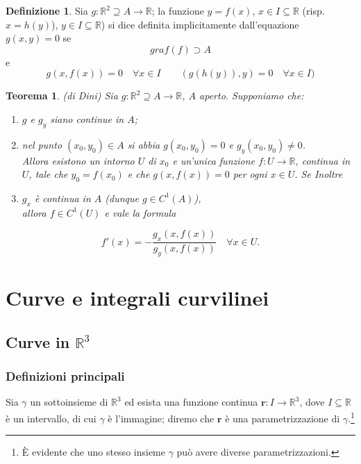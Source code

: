 \documentclass[a4paper]{book}
\numberwithin{equation}{section}
\theoremstyle{plain}
\newtheorem{teor}{Teorema}[section]
\theoremstyle{definition}
\newtheorem{defn}{Definizione}[section]
\theoremstyle{remark}
\renewcommand{\vec}{\boldsymbol}
\theoremstyle{example}
\begin{document}
\begin{defn}
	Sia $g:\mathbb{R}^2 \supseteq A \rightarrow \mathbb{R}$; la funzione $y=f(x)$, $x \in I \subseteq \mathbb{R}$ (risp. $x = h(y)$), $y \in I \subseteq \mathbb{R}$) si dice definita implicitamente dall'equazione $g(x,y) = 0$ se
	\begin{equation}
		graf(f) \supset A
	\end{equation}
	e
	\begin{equation*}
		g(x,f(x)) = 0 \quad \forall x \in I \quad \quad (g(h(y)),y) = 0 \quad \forall x \in I)
	\end{equation*}
\end{defn}

\begin{teor} (di Dini) Sia $g:\mathbb{R}^2 \supseteq A \rightarrow \mathbb{R}$, $A$ aperto. Supponiamo che:
	\begin{enumerate}
		\item $g$ e $g_y$ siano continue in $A$;
		\item nel punto $(x_0,y_0) \in A$ si abbia $g(x_0,y_0) = 0$ e $g_y(x_0,y_0) \neq 0$. \\
		Allora esistono un intorno $U$ di $x_0$ e un'unica funzione $f : U \rightarrow \mathbb{R}$, continua in $U$, tale che $y_0 = f(x_0)$ e che $g(x,f(x)) = 0$ per ogni $x \in U$. Se Inoltre
		\item $g_x$ è continua in $A$ (dunque $g \in C^1(A)$), \\
		allora $f \in C^1(U)$ e vale la formula
	\end{enumerate}
	\begin{equation}
		f'(x) = - \frac{g_x(x,f(x))}{g_y(x,f(x))} \quad \forall x \in U.
	\end{equation}

\end{teor}









\chapter{Curve e integrali curvilinei}

\section{Curve in $\mathbb{R}^3$}
\subsection{Definizioni principali}
Sia $\gamma$ un sottoinsieme di $\mathbb{R}^3$ ed esista una funzione continua $\vec{r}\colon \!I \to \mathbb{R}^3$, dove $I \subseteq \mathbb{R}$ è un intervallo, di cui $\gamma$ è l'immagine; diremo che $\vec{r}$ è una parametrizzazione di $\gamma$.\footnote{È evidente che uno stesso insieme $\gamma$ può avere diverse parametrizzazioni.}
\end{document}

